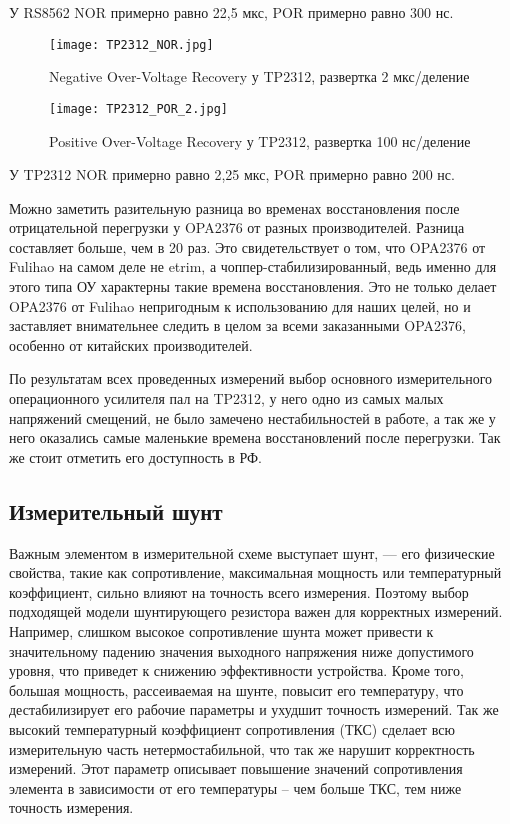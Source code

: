 У RS8562 NOR примерно равно 22,5 мкс, 
POR примерно равно 300 нс.

\begin{figure}[H]
\centering
\texttt{[image: TP2312\_NOR.jpg]}
\caption{Negative Over-Voltage Recovery у TP2312, развертка 2 мкс/деление}
\label{ris:425}
\end{figure}

\begin{figure}[H]
\centering
\texttt{[image: TP2312\_POR\_2.jpg]}
\caption{Positive Over-Voltage Recovery у TP2312, развертка 100 нс/деление}
\label{ris:426}
\end{figure}

У TP2312 NOR примерно равно 2,25 мкс,
POR примерно равно 200 нс.

Можно заметить разительную разница во временах восстановления после отрицательной перегрузки у OPA2376 от 
разных производителей. Разница составляет больше, чем в 20 раз. Это свидетельствует о том, что OPA2376 от 
Fulihao на самом деле не etrim, а чоппер-стабилизированный, ведь именно для этого типа ОУ характерны такие 
времена восстановления.
Это не только делает OPA2376 от Fulihao непригодным к использованию для наших целей, но и заставляет 
внимательнее следить в целом за всеми заказанными OPA2376, особенно от китайских производителей.

По результатам всех проведенных измерений выбор основного измерительного операционного усилителя пал на 
TP2312, у него одно из самых малых напряжений смещений, не было замечено нестабильностей в работе, 
а так же у него оказались самые маленькие времена восстановлений после перегрузки. Так же стоит отметить 
его доступность в РФ.

\subsection{Измерительный шунт}
\hspace{1cm} 

Важным элементом в измерительной схеме выступает шунт, — его физические свойства, 
такие как сопротивление, максимальная мощность или температурный коэффициент, 
сильно влияют на точность всего измерения. Поэтому выбор подходящей модели шунтирующего резистора 
важен для корректных измерений. Например, слишком высокое сопротивление шунта может привести к 
значительному падению значения выходного напряжения ниже допустимого уровня, что приведет к снижению 
эффективности устройства. Кроме того, большая мощность, рассеиваемая на шунте, повысит его температуру, 
что дестабилизирует его рабочие параметры и ухудшит точность измерений. Так же высокий температурный 
коэффициент сопротивления (ТКС) сделает всю измерительную часть нетермостабильной, что так же нарушит 
корректность измерений. Этот параметр описывает повышение значений сопротивления элемента в зависимости от
его температуры -- чем больше ТКС, тем ниже точность измерения.

